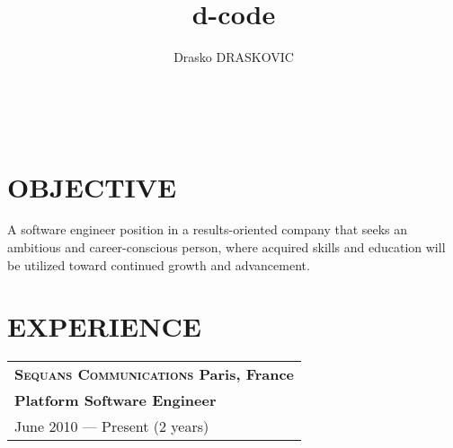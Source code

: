 \documentclass[a4paper, oneside, final]{scrartcl}
\title{d-code}
\author{Drasko DRASKOVIC}
\begin{document}

\titleformat{\section}{\large\scshape\raggedright}{}{0em}{}[\titlerule]

\begin{center}

   \textsc{\huge{}}

   \\

\end{center}

\section{OBJECTIVE}
   A software engineer position in a results-oriented company that seeks an
   ambitious and career-conscious person, where acquired skills and education
   will be utilized toward continued growth and advancement.

\section{EXPERIENCE}

\newcommand{\gray}{\rowcolor[gray]{.90}}
   \begin{tabularx}{1.0\linewidth}{X}
      \gray \bf\textsc{\large{Sequans Communications}} \normalfont\hfill Paris, France\\
      \gray \bf{Platform Software Engineer}\\
      \gray June 2010 --- Present (2 years) \\
   \end{tabularx}

\medskip
\end{document}

